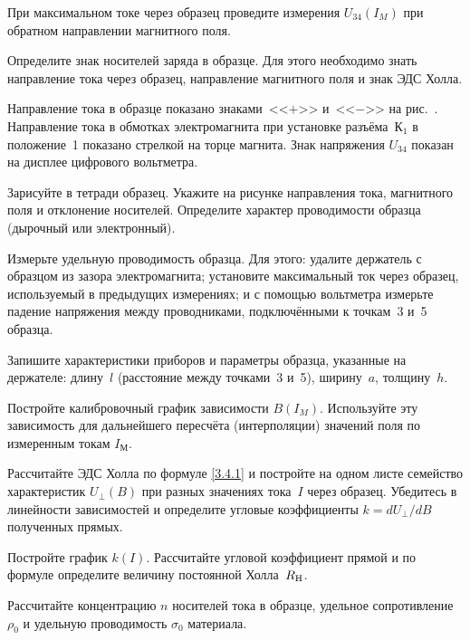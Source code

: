 \begin{lab:task}
\item При максимальном токе через образец проведите измерения $U_{34}(I_{M})$ 
при обратном направлении магнитного поля.

\item Определите знак носителей заряда в образце. Для этого необходимо знать
направление тока через образец, направление магнитного поля и знак ЭДС Холла.

Направление тока в образце показано знаками~<<$+$>> и~<<$-$>> на
рис.~. Направление тока в обмотках электромагнита при 
установке разъёма~К$_1$ в положение~1 показано стрелкой на торце магнита.
Знак напряжения $U_{34}$ показан на дисплее цифрового вольтметра.

Зарисуйте в тетради образец. Укажите на рисунке направления тока, магнитного
поля и отклонение носителей. Определите характер проводимости образца
(дырочный или электронный).

\item Измерьте удельную проводимость образца. Для этого: 
удалите держатель с образцом из зазора электромагнита;
установите максимальный ток через образец, используемый в предыдущих измерениях;
и с помощью вольтметра измерьте падение напряжения между проводниками, 
подключёнными к точкам~3 и~5 образца.

\item Запишите характеристики приборов и параметры образца, указанные на держателе:
длину~$l$ (расстояние между точками~3 и~5), ширину~$a$, толщину~$h$.



\item Постройте калибровочный график зависимости $B(I_{M})$. 
Используйте эту зависимость для дальнейшего пересчёта (интерполяции)
значений поля по измеренным токам $I_{М}$.


\item Рассчитайте ЭДС Холла по формуле \eqref{3.4.1} и постройте на одном листе
семейство характеристик $U_{\perp}(B)$ при разных значениях тока~$I$ через
образец. Убедитесь в линейности зависимостей и определите угловые 
коэффициенты $k=dU_{\perp}/dB$ полученных прямых.

\item Постройте график $k(I)$. Рассчитайте угловой коэффициент прямой 
и по формуле  определите величину постоянной Холла~$R_{\rm H}$.

\item Рассчитайте концентрацию $n$ носителей тока в образце,
удельное сопротивление $\rho_0$ и удельную проводимость $\sigma_0$ материала.


\end{lab:task}
